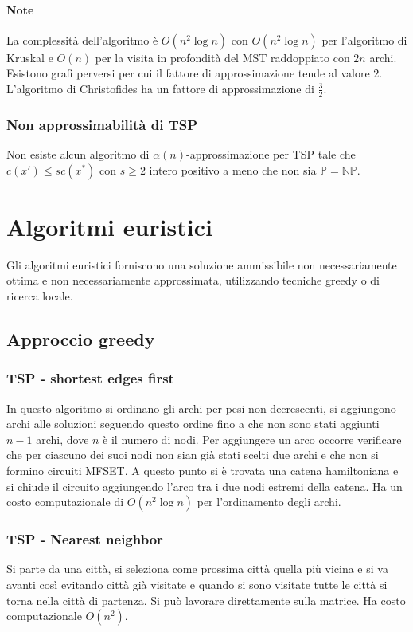 \paragraph{Note}
La complessit\`a dell'algoritmo \`e $O(n^2\log n)$ con $O(n^2\log n)$ per l'algoritmo di Kruskal e $O(n)$ per la visita in profondit\`a del MST raddoppiato con $2n$ archi. Esistono
grafi perversi per cui il fattore di approssimazione tende al valore $2$. L'algoritmo di Christofides ha un fattore di approssimazione di $\frac{3}{2}$. 
\subsubsection{Non approssimabilit\`a di TSP}
Non esiste alcun algoritmo di $\alpha(n)$-approssimazione per TSP tale che $c(x')\le sc(x^*)$ con $s\ge 2$ intero positivo a meno che non sia $\mathbb{P} = \mathbb{NP}$.
\section{Algoritmi euristici}
Gli algoritmi euristici forniscono una soluzione ammissibile non necessariamente ottima e non necessariamente approssimata, utilizzando tecniche greedy o di ricerca locale.
\subsection{Approccio greedy}
\subsubsection{TSP - shortest edges first}
In questo algoritmo si ordinano gli archi per pesi non decrescenti, si aggiungono archi alle soluzioni seguendo questo ordine fino a che non sono stati aggiunti $n-1$ archi, dove $n$
\`e il numero di nodi. Per aggiungere un arco occorre verificare che per ciascuno dei suoi nodi non sian gi\`a stati scelti due archi e che non si formino circuiti MFSET. A questo punto
si \`e trovata una catena hamiltoniana e si chiude il circuito aggiungendo l'arco tra i due nodi estremi della catena. Ha un costo computazionale di  $O(n^2\log n)$ per l'ordinamento 
degli archi.\\

\subsubsection{TSP - Nearest neighbor}
Si parte da una citt\`a, si seleziona come prossima citt\`a quella pi\`u vicina e si va avanti cos\`i evitando citt\`a gi\`a visitate e quando si sono visitate tutte le citt\`a si 
torna nella citt\`a di partenza. Si pu\`o lavorare direttamente sulla matrice. Ha costo computazionale $O(n^2)$.
